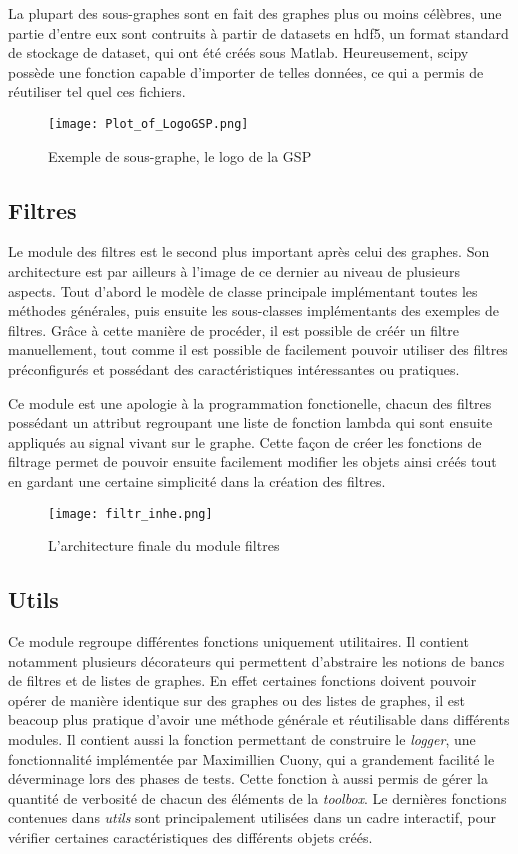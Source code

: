 La plupart des sous-graphes sont en fait des graphes plus ou moins célèbres, une partie d'entre eux sont contruits à partir de datasets en hdf5, un format standard de stockage de dataset, qui ont été créés sous Matlab. Heureusement, scipy possède une fonction capable d'importer de telles données, ce qui a permis de réutiliser tel quel ces fichiers.

\begin{figure}[!h]
    \center
    \texttt{[image: Plot\_of\_LogoGSP.png]}
    \caption{Exemple de sous-graphe, le logo de la GSP}
\end{figure}
\newpage
 

\subsection*{Filtres}

Le module des filtres est le second plus important après celui des graphes. Son architecture est par ailleurs à l'image de ce dernier au niveau de plusieurs aspects. Tout d'abord le modèle de classe principale implémentant toutes les méthodes générales, puis ensuite les sous-classes implémentants des exemples de filtres. Grâce à cette manière de procéder, il est possible de créér un filtre manuellement, tout comme il est possible de facilement pouvoir utiliser des filtres préconfigurés et possédant des caractéristiques intéressantes ou pratiques.

Ce module est une apologie à la programmation fonctionelle, chacun des filtres possédant un attribut regroupant une liste de fonction lambda qui sont ensuite appliqués au signal vivant sur le graphe. Cette façon de créer les fonctions de filtrage permet de pouvoir ensuite facilement modifier les objets ainsi créés tout en gardant une certaine simplicité dans la création des filtres.

\begin{figure}[h!]
    \center
    \texttt{[image: filtr\_inhe.png]}
    \caption{L'architecture finale du module filtres}
\end{figure}

\subsection*{Utils}

Ce module regroupe différentes fonctions uniquement utilitaires. Il contient notamment plusieurs décorateurs qui permettent d'abstraire les notions de bancs de filtres et de listes de graphes. En effet certaines fonctions doivent pouvoir opérer de manière identique sur des graphes ou des listes de graphes, il est beacoup plus pratique d'avoir une méthode générale et réutilisable dans différents modules.
Il contient aussi la fonction permettant de construire le \emph{logger}, une fonctionnalité implémentée par Maximillien Cuony, qui a grandement facilité le déverminage lors des phases de tests. Cette fonction à aussi permis de gérer la quantité de verbosité de chacun des éléments de la \emph{toolbox}.
Le dernières fonctions contenues dans \emph{utils} sont principalement utilisées dans un cadre interactif, pour vérifier certaines caractéristiques des différents objets créés.

